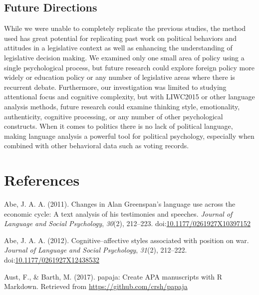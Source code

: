 \documentclass[
  english,
  ,man,floatsintext]{apa6}
\begin{document}
\hypertarget{future-directions}{%
\subsection{Future Directions}\label{future-directions}}

While we were unable to completely replicate the previous studies, the method used has great potential for replicating past work on political behaviors and attitudes in a legislative context as well as enhancing the understanding of legislative decision making. We examined only one small area of policy using a single psychological process, but future research could explore foreign policy more widely or education policy or any number of legislative areas where there is recurrent debate. Furthermore, our investigation was limited to studying attentional focus and cognitive complexity, but with LIWC2015 or other language analysis methods, future research could examine thinking style, emotionality, authenticity, cognitive processing, or any number of other psychological constructs. When it comes to politics there is no lack of political language, making language analysis a powerful tool for political psychology, especially when combined with other behavioral data such as voting records.

\newpage

\hypertarget{references}{%
\section{References}\label{references}}

\setlength{\parindent}{-0.5in}
\setlength{\leftskip}{0.5in}

\hypertarget{refs}{}
\leavevmode\hypertarget{ref-Abe2011}{}%
Abe, J. A. A. (2011). Changes in Alan Greenspan's language use across the economic cycle: A text analysis of his testimonies and speeches. \emph{Journal of Language and Social Psychology}, \emph{30}(2), 212--223. doi:\href{https://doi.org/10.1177/0261927X10397152}{10.1177/0261927X10397152}

\leavevmode\hypertarget{ref-Abe2012}{}%
Abe, J. A. A. (2012). Cognitive--affective styles associated with position on war. \emph{Journal of Language and Social Psychology}, \emph{31}(2), 212--222. doi:\href{https://doi.org/10.1177/0261927X12438532}{10.1177/0261927X12438532}

\leavevmode\hypertarget{ref-Aust2017}{}%
Aust, F., \& Barth, M. (2017). papaja: Create APA manuscripts with R Markdown. Retrieved from \url{https://github.com/crsh/papaja}
\end{document}
